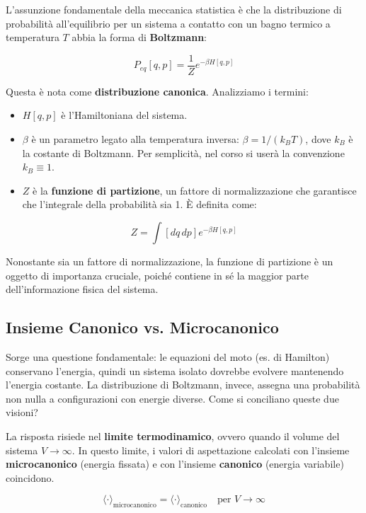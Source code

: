 L'assunzione fondamentale della meccanica statistica è che la distribuzione di probabilità all'equilibrio per un sistema a contatto con un bagno termico a temperatura $T$ abbia la forma di \textbf{Boltzmann}:

\begin{equation}
    P_{eq}[q,p] = \frac{1}{Z} e^{-\beta H[q,p]}
\end{equation}


Questa è nota come \textbf{distribuzione canonica}. Analizziamo i termini:
\begin{itemize}
    \item $H[q,p]$ è l'Hamiltoniana del sistema.
    \item $\beta$ è un parametro legato alla temperatura inversa: $\beta = 1/(k_B T)$, dove $k_B$ è la costante di Boltzmann. Per semplicità, nel corso si userà la convenzione $k_B \equiv 1$.
    \item $Z$ è la \textbf{funzione di partizione}, un fattore di normalizzazione che garantisce che l'integrale della probabilità sia 1. È definita come:
\end{itemize}

\begin{equation}
    Z = \int [dq \, dp] e^{-\beta H[q,p]}
\end{equation}


Nonostante sia un fattore di normalizzazione, la funzione di partizione è un oggetto di importanza cruciale, poiché contiene in sé la maggior parte dell'informazione fisica del sistema.

\subsection{Insieme Canonico vs. Microcanonico}

Sorge una questione fondamentale: le equazioni del moto (es. di Hamilton) conservano l'energia, quindi un sistema isolato dovrebbe evolvere mantenendo l'energia costante. La distribuzione di Boltzmann, invece, assegna una probabilità non nulla a configurazioni con energie diverse. Come si conciliano queste due visioni?

La risposta risiede nel \textbf{limite termodinamico}, ovvero quando il volume del sistema $V \to \infty$. In questo limite, i valori di aspettazione calcolati con l'insieme \textbf{microcanonico} (energia fissata) e con l'insieme \textbf{canonico} (energia variabile) coincidono.

\begin{equation}
    \langle \cdot \rangle_{\text{microcanonico}} = \langle \cdot \rangle_{\text{canonico}} \quad \text{per } V \to \infty
\end{equation}


